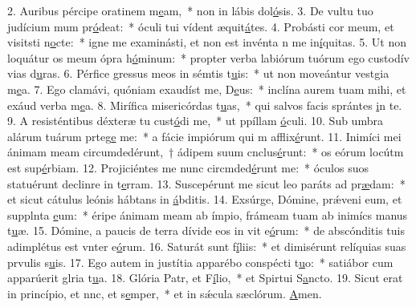 2. Auribus pércipe oratinem m\uline{e}am,~* non in lábis dol\uline{ó}sis.
3. De vultu tuo judícium mum pr\uline{ó}deat:~* óculi tui vídent æquit\uline{á}tes.
4. Probásti cor meum, et visitsti n\uline{o}cte:~* igne me examinásti, et non est invénta n me in\uline{í}quitas.
5. Ut non loquátur os meum ópra h\uline{ó}minum:~* propter verba labiórum tuórum ego custodív vias d\uline{u}ras.
6. Pérfice gressus meos in sémtis t\uline{u}is:~* ut non moveántur vestgia m\uline{e}a.
7. Ego clamávi, quóniam exaudíst me, D\uline{e}us:~* inclína aurem tuam mihi, et exáud verba m\uline{e}a.
8. Mirífica misericórdas t\uline{u}as,~* qui salvos facis sprántes \uline{i}n te.
9. A resisténtibus déxteræ tu cust\uline{ó}di me,~* ut ppíllam \uline{ó}culi.
10. Sub umbra alárum tuárum prteg\uline{e} me:~* a fácie impiórum qui m afflix\uline{é}runt.
11. Inimíci mei ánimam meam circumdedérunt,~† ádipem suum cnclus\uline{é}runt:~* os eórum locútm est sup\uline{é}rbiam.
12. Projiciéntes me nunc circmded\uline{é}runt me:~* óculos suos statuérunt declinre in t\uline{e}rram.
13. Suscepérunt me sicut leo paráts ad pr\uline{æ}dam:~* et sicut cátulus leónis hábtans in \uline{á}bditis.
14. Exsúrge, Dómine, prǽveni eum, et supplnta \uline{e}um:~* éripe ánimam meam ab ímpio, frámeam tuam ab inimícs manus t\uline{u}æ.
15. Dómine, a paucis de terra dívide eos in vit e\uline{ó}rum:~* de abscónditis tuis adimplétus est vnter e\uline{ó}rum.
16. Saturát sunt f\uline{í}liis:~* et dimisérunt relíquias suas prvulis s\uline{u}is.
17. Ego autem in justítia apparébo conspécti t\uline{u}o:~* satiábor cum apparúerit glria t\uline{u}a.
18. Glória Patr, et F\uline{í}lio,~* et Spirtui S\uline{a}ncto.
19. Sicut erat in princípio, et nnc, et s\uline{e}mper,~* et in sǽcula sæclórum. \uline{A}men.
